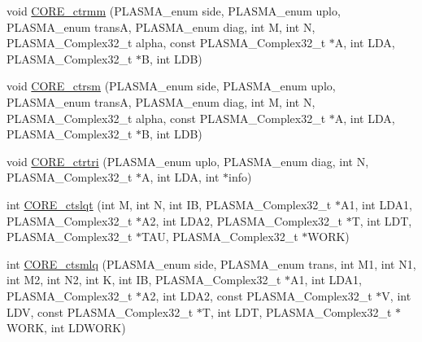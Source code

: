 \begin{DoxyCompactItemize}
\item 
void \hyperlink{group__CORE__PLASMA__Complex32__t_gad637a07cdabd30cac217af0f1278c8a0_gad637a07cdabd30cac217af0f1278c8a0}{C\+O\+R\+E\+\_\+ctrmm} (P\+L\+A\+S\+M\+A\+\_\+enum side, P\+L\+A\+S\+M\+A\+\_\+enum uplo, P\+L\+A\+S\+M\+A\+\_\+enum trans\+A, P\+L\+A\+S\+M\+A\+\_\+enum diag, int M, int N, P\+L\+A\+S\+M\+A\+\_\+\+Complex32\+\_\+t alpha, const P\+L\+A\+S\+M\+A\+\_\+\+Complex32\+\_\+t $\ast$A, int L\+D\+A, P\+L\+A\+S\+M\+A\+\_\+\+Complex32\+\_\+t $\ast$B, int L\+D\+B)
\item 
void \hyperlink{group__CORE__PLASMA__Complex32__t_ga6b165f9de02dbc2a5f6524ca7ad9650d_ga6b165f9de02dbc2a5f6524ca7ad9650d}{C\+O\+R\+E\+\_\+ctrsm} (P\+L\+A\+S\+M\+A\+\_\+enum side, P\+L\+A\+S\+M\+A\+\_\+enum uplo, P\+L\+A\+S\+M\+A\+\_\+enum trans\+A, P\+L\+A\+S\+M\+A\+\_\+enum diag, int M, int N, P\+L\+A\+S\+M\+A\+\_\+\+Complex32\+\_\+t alpha, const P\+L\+A\+S\+M\+A\+\_\+\+Complex32\+\_\+t $\ast$A, int L\+D\+A, P\+L\+A\+S\+M\+A\+\_\+\+Complex32\+\_\+t $\ast$B, int L\+D\+B)
\item 
void \hyperlink{group__CORE__PLASMA__Complex32__t_ga60551b5cf1ef39496b9c9b5ed721f332_ga60551b5cf1ef39496b9c9b5ed721f332}{C\+O\+R\+E\+\_\+ctrtri} (P\+L\+A\+S\+M\+A\+\_\+enum uplo, P\+L\+A\+S\+M\+A\+\_\+enum diag, int N, P\+L\+A\+S\+M\+A\+\_\+\+Complex32\+\_\+t $\ast$A, int L\+D\+A, int $\ast$info)
\item 
int \hyperlink{group__CORE__PLASMA__Complex32__t_gad4dfa89c572aa817837b91416c9381c0_gad4dfa89c572aa817837b91416c9381c0}{C\+O\+R\+E\+\_\+ctslqt} (int M, int N, int I\+B, P\+L\+A\+S\+M\+A\+\_\+\+Complex32\+\_\+t $\ast$A1, int L\+D\+A1, P\+L\+A\+S\+M\+A\+\_\+\+Complex32\+\_\+t $\ast$A2, int L\+D\+A2, P\+L\+A\+S\+M\+A\+\_\+\+Complex32\+\_\+t $\ast$T, int L\+D\+T, P\+L\+A\+S\+M\+A\+\_\+\+Complex32\+\_\+t $\ast$T\+A\+U, P\+L\+A\+S\+M\+A\+\_\+\+Complex32\+\_\+t $\ast$W\+O\+R\+K)
\item 
int \hyperlink{group__CORE__PLASMA__Complex32__t_ga5d276b7c438fe41e6e0e244ddd7b3edc_ga5d276b7c438fe41e6e0e244ddd7b3edc}{C\+O\+R\+E\+\_\+ctsmlq} (P\+L\+A\+S\+M\+A\+\_\+enum side, P\+L\+A\+S\+M\+A\+\_\+enum trans, int M1, int N1, int M2, int N2, int K, int I\+B, P\+L\+A\+S\+M\+A\+\_\+\+Complex32\+\_\+t $\ast$A1, int L\+D\+A1, P\+L\+A\+S\+M\+A\+\_\+\+Complex32\+\_\+t $\ast$A2, int L\+D\+A2, const P\+L\+A\+S\+M\+A\+\_\+\+Complex32\+\_\+t $\ast$V, int L\+D\+V, const P\+L\+A\+S\+M\+A\+\_\+\+Complex32\+\_\+t $\ast$T, int L\+D\+T, P\+L\+A\+S\+M\+A\+\_\+\+Complex32\+\_\+t $\ast$W\+O\+R\+K, int L\+D\+W\+O\+R\+K)
\item 

\end{DoxyCompactItemize}
